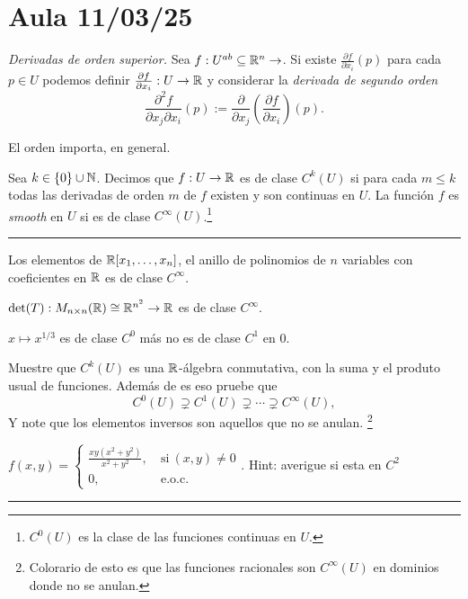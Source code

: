 \section*{Aula 11/03/25}

\begin{definition}
    \textit{Derivadas de orden superior.} Sea \(f: U^{ab}\subseteq \mathbb{R}^n \rightarrow\). Si existe \(\frac{\partial f }{\partial x_i}(p)\) para cada \(p\in U\) podemos definir \(\frac{\partial f}{\partial x_i}: U \rightarrow \mathbb{R}\) y considerar la \emph{derivada de segundo orden}
    \[\frac{\partial^2 f}{\partial x_j \partial x_i}(p) := \frac{\partial}{\partial x_j}\left(\frac{\partial f}{\partial x_i}\right)(p).\]
\end{definition}

\begin{note}
    El orden importa, en general. 
\end{note}

\begin{definition}
    Sea \(k\in \{0\}\cup \mathbb{N} \). Decimos que \(f:U\rightarrow \mathbb{R}\) es de clase \(C^k(U)\) si para cada \(m \leq k\) todas las derivadas de orden \(m\) de \(f\) existen y son continuas en \(U\). La función \(f\) es \emph{smooth} en \(U\) si es de clase \(C^\infty(U)\).\footnote{\(C^0(U)\) es la clase de las funciones continuas en \(U\).} 
\end{definition}

\vspace{0.2in}

\hrule
\begin{example}
    Los elementos de \(\mathbb{R}[x_1,\ldots,x_n]\), el anillo de polinomios de \(n\) variables con coeficientes en \(\mathbb{R}\) es de clase \(C^\infty\). 
\end{example}
\begin{example}
    \(\det(T): M_{n\times n}(\mathbb{R}) \cong \mathbb{R}^{n^2}\rightarrow \mathbb{R}\) es de clase \(C^\infty\). 
\end{example}
\begin{example}
    \(x\mapsto x^{1/3}\) es de clase \(C^0\) más no es de clase \(C^1\) en \(0\). 
\end{example}
\begin{exercise}
    Muestre que \(C^k(U)\) es una \(\mathbb{R}\)-álgebra conmutativa, con la suma y el produto usual de funciones. Además de es eso pruebe que 
    \[C^0(U)\supsetneq C^1(U)\supsetneq \cdots \supsetneq C^\infty(U), \]
    Y note que los elementos inversos son aquellos que no se anulan. \footnote{Colorario de esto es que las funciones racionales son \(C^\infty(U) \) en dominios donde no se anulan.} 
\end{exercise}
\begin{example}
    \(\displaystyle f(x,y) = \begin{cases}
        \frac{xy(x^2+y^2)}{x^2+y^2}, \ &\text{si}\ (x,y)\neq 0 \\
        0, \ &\text{e.o.c.}
    \end{cases}\). Hint: averigue si esta en \(C^2\)
\end{example}
\hrule 

